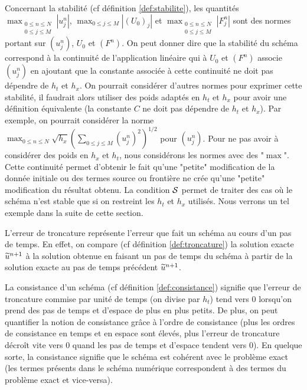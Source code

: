 \documentclass[12pt,a4paper,twoside]{article}
\begin{document}
Concernant la stabilit\'e (cf d\'efinition \ref{def:stabilite}),
les quantit\'es $\max_{\substack{0\leq n \leq N\\ 0 \leq j \leq M}} | u_j^n |$, 
$\max_{0\leq j \leq M} | (U_0)_j |$ et $\max_{\substack{0\leq n \leq N\\ 0 \leq j \leq M}} | F_j^n |$ 
sont des normes portant sur $(u_j^n)$, $U_0$ et $(F^n)$.
On peut donner dire que la stabilit\'e du sch\'ema correspond \`a
la continuit\'e de l'application lin\'eaire qui \`a 
$U_0$ et $(F^n)$ associe $(u_j^n)$ en ajoutant que la constante
associ\'ee \`a cette continuit\'e ne doit pas d\'ependre
de $h_t$ et $h_x$.
On pourrait consid\'erer d'autres normes pour exprimer cette stabilit\'e,
il faudrait alors utiliser des poids adapt\'es en $h_t$ et $h_x$ pour 
avoir une d\'efinition \'equivalente (la constante $C$ ne doit
pas d\'ependre de $h_t$ et $h_x$).
Par exemple, on pourrait consid\'erer la norme
$\max_{0\leq n \leq N} \sqrt{h_x} (\sum_{0\leq j \leq M} (u_j^n)^2)^{1/2}$
pour $(u_j^n)$.
Pour ne pas avoir \`a consid\'erer des poids en $h_x$ et $h_t$,
nous consid\'erons les normes avec des "$\max$".
Cette continuit\'e permet d'obtenir le fait qu'une "petite"
modification de la donn\'ee initiale ou des termes source
ou fronti\`ere ne cr\'ee qu'une "petite" modification
du r\'esultat obtenu.
La condition $\mathcal{S}$ permet de traiter des cas o\`u le sch\'ema
n'est stable que si on restreint les $h_t$ et $h_x$ utilis\'es.
Nous verrons un tel exemple dans la suite de cette section.


L'erreur de troncature repr\'esente l'erreur que fait un sch\'ema
au cours d'un pas de temps.
En effet, on compare (cf d\'efinition \ref{def:troncature})
la solution exacte $\widetilde{u}^{n+1}$ \`a la solution 
obtenue en faisant un pas de temps du sch\'ema
\`a partir de la solution exacte au pas de temps
pr\'ec\'edent $\widetilde{u}^{n+1}$.


La consistance d'un sch\'ema (cf d\'efinition \ref{def:consistance})
signifie que l'erreur de troncature commise par unit\'e de temps
(on divise par $h_t$) tend vers $0$ lorsqu'on prend 
des pas de temps et d'espace de plus en plus petits.
De plus, on peut quantifier la notion de consistance
gr\^ace \`a l'ordre de consistance 
(plus les ordres de consistance en temps et en espace sont \'elev\'es,
plus l'erreur de troncature d\'ecro\^it vite vers $0$ quand les pas 
de temps et d'espace tendent vers $0$).
En quelque sorte, la consistance signifie que le sch\'ema est
coh\'erent avec le probl\`eme exact 
(les termes pr\'esents dans le sch\'ema num\'erique correspondent
\`a des termes du probl\`eme exact et vice-versa).
\end{document}
